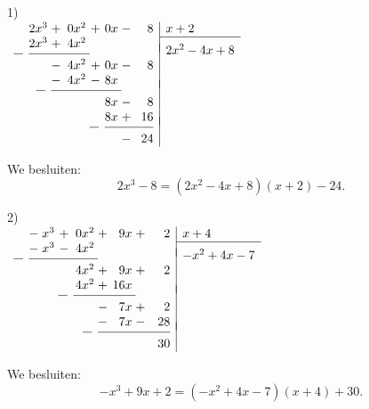 \documentclass{ximera}
\begin{document}
\noindent
\begin{minipage}{.5\textwidth}
1)\\
$\ds{
\begin{array}{r@{\;}r@{\;}c@{\;}r@{\;}c@{\;}r@{\;}c@{\;}r|l}
&2x^3&+&0x^2&+&0x&-&8&x+2\\\cline{9-9}
&2x^3&+&4x^2&&&&&\\[-1.5ex]
\rule{.26cm}{0.4pt}\hspace{2pt}&\multicolumn{3}{@{}l@{}}{\rule{1.72cm}{0.4pt}}&&&&&2x^2-4x+8\\
&&-&4x^2&+&0x&-&8&\\
&&-&4x^2&-&8x&&&\\[-1.5ex]
&\rule{.26cm}{0.4pt}\hspace{2pt}&\multicolumn{4}{@{}l@{}}{\rule{1.99cm}{0.4pt}}&&&\\
&&&&&8x&-&8&\\
&&&&&8x&+&16&\\[-1.5ex]
&&&&\rule{.26cm}{0.4pt}\hspace{2pt}&\multicolumn{3}{@{}l|}{\rule{1.38cm}{0.4pt}}&\\
&&&&&&-&24&
\end{array}
}$

\vspace{.7cm}

We besluiten:\[2x^3-8=(2x^2-4x+8)(x+2)-24.\]
\end{minipage}
\hspace{.5cm}
\begin{minipage}{.5\textwidth}
2)\\
$\ds{
\begin{array}{r@{\;}c@{\;}r@{\;}c@{\;}r@{\;}c@{\;}r@{\;}c@{\;}r|l}
&-&x^3&+&0x^2&+&9x&+&2&x+4\\\cline{10-10}
&-&x^3&-&4x^2&&&&&\\[-1.5ex]
\rule{.26cm}{0.4pt}\hspace{2pt}&\multicolumn{4}{@{}l@{}}{\rule{1.95cm}{0.4pt}}&&&&&-x^2+4x-7\\
&&&&4x^2&+&9x&+&2&\\
&&&&4x^2&+&16x&&&\\[-1.5ex]
&&&\rule{.26cm}{0.4pt}\hspace{2pt}&\multicolumn{3}{@{}l@{}}{\rule{1.76cm}{0.4pt}}&&&\\
&&&&&-&7x&+&2&\\
&&&&&-&7x&-&28&\\[-1.5ex]
&&&&\rule{.26cm}{0.4pt}\hspace{2pt}&\multicolumn{4}{@{}l|}{\rule{2.04cm}{0.4pt}}&\\
&&&&&&&&30&
\end{array}
}$

\vspace{.7cm}

We besluiten:\[-x^3+9x+2=(-x^2+4x-7)(x+4)+30.\]
\end{minipage}
\end{document}
